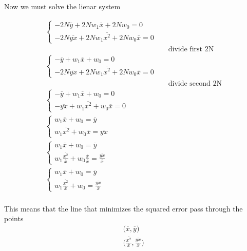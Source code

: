\documentclass[10pt,a4paper]{article}
\newcommand*\mean[1]{\overline{#1}}
\begin{document}
	Now we must solve the lienar system
	
	\begin{align*}
		\begin{cases}
			-2N\mean{y}+2Nw_1\mean{x}+2Nw_0=0\\
			-2N\mean{yx}+2Nw_1\mean{x^2}+2Nw_0\mean{x}=0
		\end{cases}\\
		&& \text{divide first 2N}\\
		\begin{cases}
			-\mean{y}+w_1\mean{x}+w_0=0\\
			-2N\mean{yx}+2Nw_1\mean{x^2}+2Nw_0\mean{x}=0
		\end{cases}\\
		&& \text{divide second 2N}\\
		\begin{cases}
			-\mean{y}+w_1\mean{x}+w_0=0\\
			-\mean{yx}+w_1\mean{x^2}+w_0\mean{x}=0
		\end{cases}\\
		\begin{cases}
			w_1\mean{x}+w_0=\mean{y}\\
			w_1\mean{x^2}+w_0\mean{x}=\mean{yx}
		\end{cases}\\
		\begin{cases}
			w_1\mean{x}+w_0=\mean{y}\\
			w_1\frac{\mean{x^2}}{\mean{x}}+w_0\frac{\mean{x}}{\mean{x}}=\frac{\mean{yx}}{\mean{x}}
		\end{cases}\\
		\begin{cases}
		w_1\mean{x}+w_0=\mean{y}\\
		w_1\frac{\mean{x^2}}{\mean{x}}+w_0=\frac{\mean{yx}}{\mean{x}}
		\end{cases}\\
	\end{align*}
	
	This means that the line that minimizes the squared error pass through the points
	\begin{align*}
		\big(\mean{x},\mean{y}\big)\\
		\big(\frac{\mean{x^2}}{\mean{x}},\frac{\mean{yx}}{\mean{x}}\big)\\
	\end{align*}
	
\end{document}
